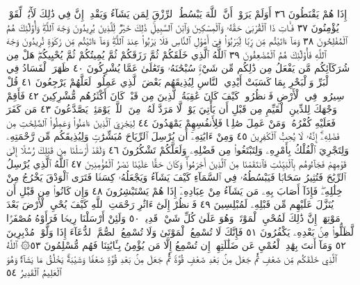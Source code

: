 إِذَا هُمْ يَقْنَطُونَ ٣٦ أَوَلَمْ يَرَوْا۟ أَنَّ ٱللَّهَ يَبْسُطُ ٱلرِّزْقَ لِمَن يَشَآءُ
وَيَقْدِرُۚ إِنَّ فِي ذَٰلِكَ لَأٓيَٰتࣲ لِّقَوْمࣲ يُؤْمِنُونَ ٣٧ فَـَٔاتِ ذَا ٱلْقُرْبَىٰ
حَقَّهُۥ وَٱلْمِسْكِينَ وَٱبْنَ ٱلسَّبِيلِۚ ذَٰلِكَ خَيْرࣱ لِّلَّذِينَ يُرِيدُونَ
وَجْهَ ٱللَّهِۖ وَأُو۟لَٰٓئِكَ هُمُ ٱلْمُفْلِحُونَ ٣٨ وَمَآ ءَاتَيْتُم مِّن رِّبࣰا
لِّيَرْبُوَا۟ فِيٓ أَمْوَٰلِ ٱلنَّاسِ فَلَا يَرْبُوا۟ عِندَ ٱللَّهِۖ وَمَآ ءَاتَيْتُم مِّن
زَكَوٰةࣲ تُرِيدُونَ وَجْهَ ٱللَّهِ فَأُو۟لَٰٓئِكَ هُمُ ٱلْمُضْعِفُونَ ٣٩
ٱللَّهُ ٱلَّذِي خَلَقَكُمْ ثُمَّ رَزَقَكُمْ ثُمَّ يُمِيتُكُمْ ثُمَّ يُحْيِيكُمْۖ هَلْ مِن
شُرَكَآئِكُم مَّن يَفْعَلُ مِن ذَٰلِكُم مِّن شَيْءࣲۚ سُبْحَٰنَهُۥ وَتَعَٰلَىٰ
عَمَّا يُشْرِكُونَ ٤٠ ظَهَرَ ٱلْفَسَادُ فِي ٱلْبَرِّ وَٱلْبَحْرِ بِمَا كَسَبَتْ
أَيْدِي ٱلنَّاسِ لِيُذِيقَهُم بَعْضَ ٱلَّذِي عَمِلُوا۟ لَعَلَّهُمْ يَرْجِعُونَ ٤١
قُلْ سِيرُوا۟ فِي ٱلْأَرْضِ فَٱنظُرُوا۟ كَيْفَ كَانَ عَٰقِبَةُ ٱلَّذِينَ مِن قَبْلُۚ
كَانَ أَكْثَرُهُم مُّشْرِكِينَ ٤٢ فَأَقِمْ وَجْهَكَ لِلدِّينِ ٱلْقَيِّمِ مِن
قَبْلِ أَن يَأْتِيَ يَوْمࣱ لَّا مَرَدَّ لَهُۥ مِنَ ٱللَّهِۖ يَوْمَئِذࣲ يَصَّدَّعُونَ ٤٣ مَن
كَفَرَ فَعَلَيْهِ كُفْرُهُۥۖ وَمَنْ عَمِلَ صَٰلِحࣰا فَلِأَنفُسِهِمْ يَمْهَدُونَ ٤٤
لِيَجْزِيَ ٱلَّذِينَ ءَامَنُوا۟ وَعَمِلُوا۟ ٱلصَّٰلِحَٰتِ مِن فَضْلِهِۦٓۚ إِنَّهُۥ لَا يُحِبُّ
ٱلْكَٰفِرِينَ ٤٥ وَمِنْ ءَايَٰتِهِۦٓ أَن يُرْسِلَ ٱلرِّيَاحَ مُبَشِّرَٰتࣲ وَلِيُذِيقَكُم
مِّن رَّحْمَتِهِۦ وَلِتَجْرِيَ ٱلْفُلْكُ بِأَمْرِهِۦ وَلِتَبْتَغُوا۟ مِن فَضْلِهِۦ وَلَعَلَّكُمْ
تَشْكُرُونَ ٤٦ وَلَقَدْ أَرْسَلْنَا مِن قَبْلِكَ رُسُلًا إِلَىٰ قَوْمِهِمْ فَجَآءُوهُم
بِٱلْبَيِّنَٰتِ فَٱنتَقَمْنَا مِنَ ٱلَّذِينَ أَجْرَمُوا۟ۖ وَكَانَ حَقًّا عَلَيْنَا نَصْرُ
ٱلْمُؤْمِنِينَ ٤٧ ٱللَّهُ ٱلَّذِي يُرْسِلُ ٱلرِّيَٰحَ فَتُثِيرُ سَحَابࣰا فَيَبْسُطُهُۥ
فِي ٱلسَّمَآءِ كَيْفَ يَشَآءُ وَيَجْعَلُهُۥ كِسَفࣰا فَتَرَى ٱلْوَدْقَ يَخْرُجُ مِنْ
خِلَٰلِهِۦۖ فَإِذَآ أَصَابَ بِهِۦ مَن يَشَآءُ مِنْ عِبَادِهِۦٓ إِذَا هُمْ يَسْتَبْشِرُونَ ٤٨
وَإِن كَانُوا۟ مِن قَبْلِ أَن يُنَزَّلَ عَلَيْهِم مِّن قَبْلِهِۦ لَمُبْلِسِينَ ٤٩
فَٱنظُرْ إِلَىٰٓ ءَاثَٰرِ رَحْمَتِ ٱللَّهِ كَيْفَ يُحْيِ ٱلْأَرْضَ بَعْدَ مَوْتِهَآۚ
إِنَّ ذَٰلِكَ لَمُحْيِ ٱلْمَوْتَىٰۖ وَهُوَ عَلَىٰ كُلِّ شَيْءࣲ قَدِيرࣱ ٥٠
وَلَئِنْ أَرْسَلْنَا رِيحࣰا فَرَأَوْهُ مُصْفَرࣰّا لَّظَلُّوا۟ مِنۢ بَعْدِهِۦ يَكْفُرُونَ ٥١
فَإِنَّكَ لَا تُسْمِعُ ٱلْمَوْتَىٰ وَلَا تُسْمِعُ ٱلصُّمَّ ٱلدُّعَآءَ إِذَا وَلَّوْا۟
مُدْبِرِينَ ٥٢ وَمَآ أَنتَ بِهَٰدِ ٱلْعُمْيِ عَن ضَلَٰلَتِهِمْۖ إِن تُسْمِعُ إِلَّا
مَن يُؤْمِنُ بِـَٔايَٰتِنَا فَهُم مُّسْلِمُونَ ٥٣۞ ٱللَّهُ ٱلَّذِي خَلَقَكُم
مِّن ضَعْفࣲ ثُمَّ جَعَلَ مِنۢ بَعْدِ ضَعْفࣲ قُوَّةࣰ ثُمَّ جَعَلَ مِنۢ بَعْدِ
قُوَّةࣲ ضَعْفࣰا وَشَيْبَةࣰۚ يَخْلُقُ مَا يَشَآءُۚ وَهُوَ ٱلْعَلِيمُ ٱلْقَدِيرُ ٥٤
